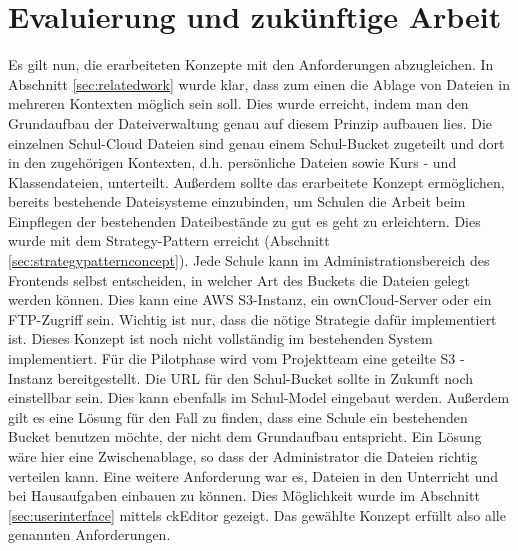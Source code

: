 \section{Evaluierung und zukünftige Arbeit}
\label{sec:evaluation}

Es gilt nun, die erarbeiteten Konzepte mit den Anforderungen abzugleichen. In Abschnitt \ref{sec:relatedwork} wurde klar, dass zum einen die Ablage von Dateien in mehreren Kontexten möglich sein soll. Dies wurde erreicht, indem man den Grundaufbau der Dateiverwaltung genau auf diesem Prinzip aufbauen lies. Die einzelnen Schul-Cloud Dateien sind genau einem Schul-Bucket zugeteilt und dort in den zugehörigen Kontexten, d.h. persönliche Dateien sowie Kurs - und Klassendateien, unterteilt. Außerdem sollte das erarbeitete Konzept ermöglichen, bereits bestehende Dateisysteme einzubinden, um Schulen die Arbeit beim Einpflegen der bestehenden Dateibestände zu gut es geht zu erleichtern. Dies wurde mit dem Strategy-Pattern erreicht (Abschnitt \ref{sec:strategypatternconcept}). Jede Schule kann im Administrationsbereich des Frontends selbst entscheiden, in welcher Art des Buckets die Dateien gelegt werden können. Dies kann eine AWS S3-Instanz, ein ownCloud-Server oder ein FTP-Zugriff sein. Wichtig ist nur, dass die nötige Strategie dafür implementiert ist. Dieses Konzept ist noch nicht vollständig im bestehenden System implementiert. Für die Pilotphase wird vom Projektteam eine geteilte S3 - Instanz bereitgestellt. Die URL für den Schul-Bucket sollte in Zukunft noch einstellbar sein. Dies kann ebenfalls im Schul-Model eingebaut werden. Außerdem gilt es eine Lösung für den Fall zu finden, dass eine Schule ein bestehenden Bucket benutzen möchte, der nicht dem Grundaufbau entspricht. Ein Lösung wäre hier eine Zwischenablage, so dass der Administrator die Dateien richtig verteilen kann. Eine weitere Anforderung war es, Dateien in den Unterricht und bei Hausaufgaben einbauen zu können. Dies Möglichkeit wurde im Abschnitt \ref{sec:userinterface} mittels ckEditor gezeigt. Das gewählte Konzept erfüllt also alle genannten Anforderungen.

